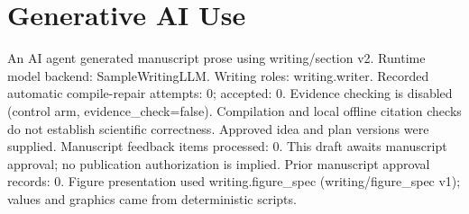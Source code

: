 \section*{Generative AI Use}
An AI agent generated manuscript prose using writing/section v2.
Runtime model backend: SampleWritingLLM.
Writing roles: writing.writer. Recorded automatic compile-repair attempts: 0; accepted: 0.
Evidence checking is disabled (control arm, evidence\_check=false). Compilation and local offline citation checks do not establish scientific correctness.
Approved idea and plan versions were supplied. Manuscript feedback items processed: 0. This draft awaits manuscript approval; no publication authorization is implied.
Prior manuscript approval records: 0.
Figure presentation used writing.figure\_spec (writing/figure\_spec v1); values and graphics came from deterministic scripts.
\ifdefined\pdfinfo{}\fi
